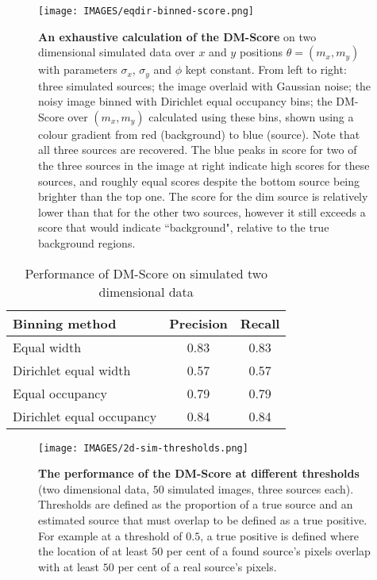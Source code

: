 \begin{figure}
\centering
\texttt{[image: IMAGES/eqdir-binned-score.png]}
\caption[Exhaustive calculation of the DM-Score (2D)]{\textbf{An exhaustive calculation of the DM-Score} on two dimensional simulated data over $x$ and $y$ positions $\theta = (m_x, m_y)$ with parameters $\sigma_x$,  $\sigma_y$ and $\phi$ kept constant. From left to right: three simulated sources; the image overlaid with Gaussian noise; the noisy image binned with Dirichlet equal occupancy bins; the DM-Score over $(m_x,m_y)$ calculated using these bins, shown using a colour gradient from red (background) to blue (source). Note that all three sources are recovered. The blue peaks in score for two of the three sources in the image at right indicate high scores for these sources, and roughly equal scores despite the bottom source being brighter than the top one. The score for the dim source is relatively lower than that for the other two sources, however it still exceeds a score that would indicate ``background", relative to the true background regions.} 
\label{fig:eqdir-binned-score}
\end{figure}

\begin{table}
\centering
\caption[Performance of the DM-Score (simulated 2D)]{Performance of DM-Score on simulated two dimensional data}
\begin{tabular}{l c c}
\hline
Binning method  & Precision & Recall \\\hline
Equal width & 0.83 & 0.83  \\
Dirichlet equal width & 0.57 & 0.57 \\
Equal occupancy & 0.79 & 0.79 \\
Dirichlet equal occupancy & 0.84 & 0.84 \\\hline
\end{tabular}
\label{table:2d-sim}
\end{table}

\begin{figure}
\centering
\texttt{[image: IMAGES/2d-sim-thresholds.png]}
\caption[The DM-Score on at different thresholds (2D)]{\textbf{The performance of the DM-Score at different thresholds} (two dimensional data, $50$ simulated images, three sources each). Thresholds are defined as the proportion of a true source and an estimated source that must overlap to be defined as a true positive. For example at a threshold of $0.5$, a true positive is defined where the location of at least $50$ per cent of a found source's pixels overlap with at least $50$ per cent of a real source's pixels.}
\label{fig:2d-sim-thresholds}
\end{figure}

